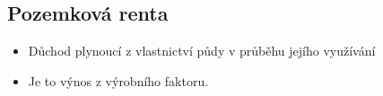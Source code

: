 \subsection{Pozemková renta}
\begin{itemize}
    \item Důchod plynoucí z vlastnictví půdy v průběhu jejího využívání
    \item Je to výnos z výrobního faktoru.
\end{itemize}